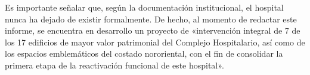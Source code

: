 Es importante señalar que, según la documentación institucional, el hospital nunca ha dejado de existir formalmente. De hecho, al momento de redactar este informe, se encuentra en desarrollo un proyecto de «intervención integral de 7 de los 17 edificios de mayor valor patrimonial del Complejo Hospitalario, así como de los espacios emblemáticos del costado nororiental, con el fin de consolidar la primera etapa de la reactivación funcional de este hospital».